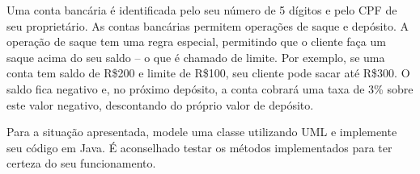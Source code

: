 \documentclass{lib/eng_softdoc}
\begin{document}
\makeheader

\problem  Uma conta bancária é identificada pelo seu número de 5 dígitos e pelo CPF de seu proprietário. As contas bancárias permitem operações de saque e depósito. A operação de saque tem uma regra especial, permitindo que o cliente faça um saque acima do seu saldo – o que é chamado de limite. Por exemplo, se uma conta tem saldo de R\$200 e limite de R\$100, seu cliente pode sacar até R\$300. O saldo fica negativo e, no próximo depósito, a conta cobrará uma taxa de 3\% sobre este valor negativo, descontando do próprio valor de depósito.

Para a situação apresentada, modele uma classe utilizando UML e implemente seu código em Java. É aconselhado testar os métodos implementados para ter certeza do seu funcionamento.
\end{document}
